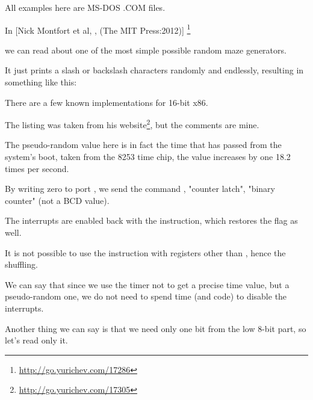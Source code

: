 
All examples here are MS-DOS .COM files.

In [Nick Montfort et al, , (The MIT Press:2012)]
\footnote{\AlsoAvailableAs \url{http://go.yurichev.com/17286}}

we can read about one of the most simple possible random maze generators.

It just prints a slash or backslash characters randomly and endlessly, resulting in something like this:

\begin{figure}[H]
\centering
{}
\end{figure}


There are a few known implementations for 16-bit x86.


\newcommand{\FNURLTRIXTER}{\footnote{\url{http://go.yurichev.com/17305}}}

The listing was taken from his website\FNURLTRIXTER, 
but the comments are mine.



The pseudo-random value here is in fact the time 
that has passed from the system's boot, taken from the 8253 time chip, the value increases by one 18.2 times per second.

By writing zero to port , 
we send the command , 
"counter latch", 
"binary counter" (not a \ac{BCD} value).

The interrupts are enabled back with the  instruction, which restores the  flag as well.

It is not possible to 
use the  instruction with registers other than , 
hence the shuffling.


We can say that since we use the timer not 
to get a precise time value, but a pseudo-random one, we do not need
to spend time (and code) to disable the interrupts.

Another thing we can say is that we need only one bit from the low 8-bit part, so let's read only it.

